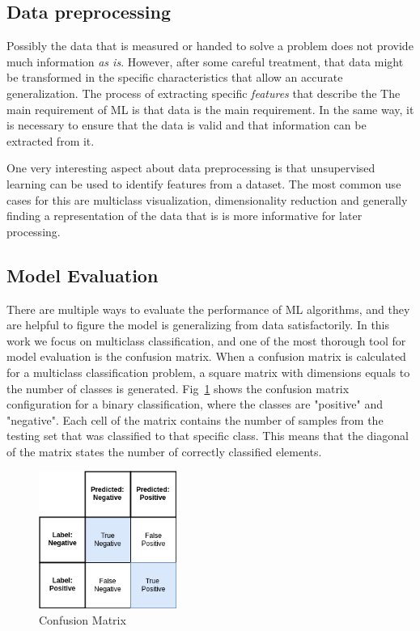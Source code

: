 \subsection{Data preprocessing}
Possibly the data that is measured or handed to solve a problem does not provide much information \emph{as is}. However, after some careful treatment, that data might be transformed in the specific characteristics that allow an accurate generalization. The process of extracting specific \emph{features} that describe the
The main requirement of \ac{ML} is that data is the main requirement. In the same way, it is necessary to ensure that the data is valid and that information can be extracted from it.

One very interesting aspect about data preprocessing is that unsupervised learning can be used to identify features from a dataset. The most common use cases for this are multiclass visualization, dimensionality reduction and generally finding a representation of the data that is is more informative for later processing.

\subsection{Model Evaluation}
There are multiple ways to evaluate the performance of \ac{ML} algorithms, and they are helpful to figure the model is generalizing from data satisfactorily. In this work we focus on multiclass classification, and one of the most thorough tool for model evaluation is the confusion matrix. When a confusion matrix is calculated for a multiclass classification problem, a square matrix with dimensions equals to the number of classes is generated. Fig~\ref{fig:conf_matrix} shows the confusion matrix configuration for a binary classification, where the classes are "positive" and "negative". Each cell of the matrix contains the number of samples from the testing set that was classified to that specific class. This means that the diagonal of the matrix states the number of correctly classified elements.

\begin{figure}[htb]
    \centering
      \includegraphics[width=0.4\textwidth]{figures/cm}
      \caption{Confusion Matrix}
      \label{fig:conf_matrix}
\end{figure}

